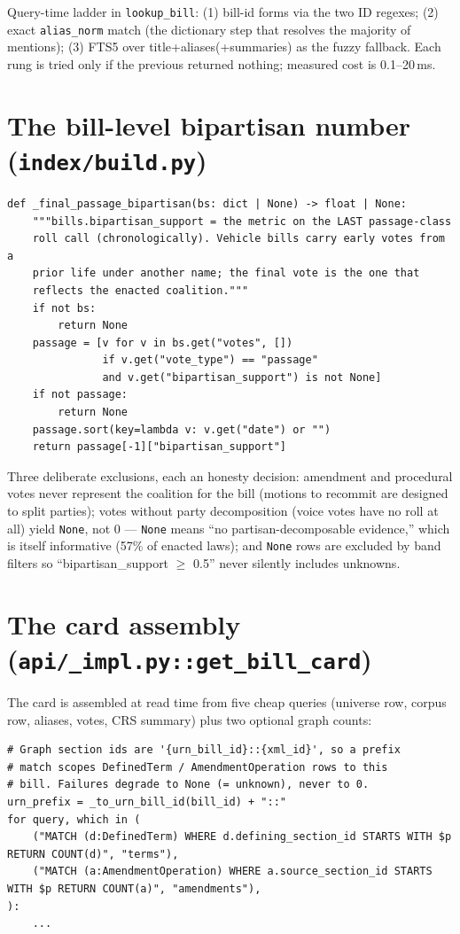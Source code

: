 \documentclass[11pt]{article}
\newcommand{\file}[1]{\texttt{#1}}
\newcommand{\code}[1]{\texttt{#1}}
\begin{document}
Query-time ladder in \code{lookup\_bill}: (1) bill-id forms via the two
ID regexes; (2) exact \code{alias\_norm} match (the dictionary step that
resolves the majority of mentions); (3) FTS5 over
title+aliases(+summaries) as the fuzzy fallback. Each rung is tried only if
the previous returned nothing; measured cost is 0.1--20\,ms.

\section{The bill-level bipartisan number (\file{index/build.py})}
\label{sec:finalpassage}

\begin{lstlisting}
def _final_passage_bipartisan(bs: dict | None) -> float | None:
    """bills.bipartisan_support = the metric on the LAST passage-class
    roll call (chronologically). Vehicle bills carry early votes from a
    prior life under another name; the final vote is the one that
    reflects the enacted coalition."""
    if not bs:
        return None
    passage = [v for v in bs.get("votes", [])
               if v.get("vote_type") == "passage"
               and v.get("bipartisan_support") is not None]
    if not passage:
        return None
    passage.sort(key=lambda v: v.get("date") or "")
    return passage[-1]["bipartisan_support"]
\end{lstlisting}

Three deliberate exclusions, each an honesty decision: amendment and
procedural votes never represent the coalition for the bill (motions to
recommit are designed to split parties); votes without party decomposition
(voice votes have no roll at all) yield \code{None}, not 0 --- \code{None}
means ``no partisan-decomposable evidence,'' which is itself informative
(57\% of enacted laws); and \code{None} rows are excluded by band filters so
``bipartisan\_support $\ge$ 0.5'' never silently includes unknowns.

\section{The card assembly (\file{api/\_impl.py::get\_bill\_card})}
\label{sec:card}

The card is assembled at read time from five cheap queries (universe row,
corpus row, aliases, votes, CRS summary) plus two optional graph counts:

\begin{lstlisting}
# Graph section ids are '{urn_bill_id}::{xml_id}', so a prefix
# match scopes DefinedTerm / AmendmentOperation rows to this
# bill. Failures degrade to None (= unknown), never to 0.
urn_prefix = _to_urn_bill_id(bill_id) + "::"
for query, which in (
    ("MATCH (d:DefinedTerm) WHERE d.defining_section_id STARTS WITH $p RETURN COUNT(d)", "terms"),
    ("MATCH (a:AmendmentOperation) WHERE a.source_section_id STARTS WITH $p RETURN COUNT(a)", "amendments"),
):
    ...
\end{lstlisting}
\end{document}
